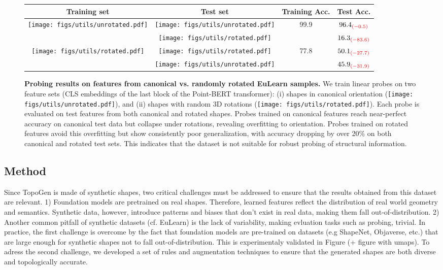 \begin{figure}[t]
\centering
\begin{tabular}{c c c c}
\toprule
\textbf{Training set} & \textbf{Test set} & \textbf{Training Acc.} & \textbf{Test Acc.} \\
\bottomrule
\multirow{2}{*}{\texttt{[image: figs/utils/unrotated.pdf]}} 
  & \texttt{[image: figs/utils/unrotated.pdf]} 
  & \multirow{2}{*}{99.9} 
  & $96.4_{\textcolor{red}{(-0.5)}}$ \\
& \texttt{[image: figs/utils/rotated.pdf]} 
  &  
  & $16.3_{\textcolor{red}{(-83.6)}}$ \\
\midrule
\multirow{2}{*}{\texttt{[image: figs/utils/rotated.pdf]}} 
  & \texttt{[image: figs/utils/rotated.pdf]} 
  & \multirow{2}{*}{77.8} 
  & $50.1_{\textcolor{red}{(-27.7)}}$ \\
& \texttt{[image: figs/utils/unrotated.pdf]} 
  &  
  & $45.9_{\textcolor{red}{(-31.9)}}$ \\
\bottomrule
\end{tabular}
\caption{\textbf{Probing results on features from canonical vs. randomly rotated EuLearn samples.} 
We train linear probes on two feature sets (CLS embeddings of the last block of the Point-BERT transformer): 
(i) shapes in canonical orientation (\texttt{[image: figs/utils/unrotated.pdf]}), and 
(ii) shapes with random 3D rotations (\texttt{[image: figs/utils/rotated.pdf]}). 
Each probe is evaluated on test features from both canonical and rotated shapes. 
Probes trained on canonical features reach near-perfect accuracy on canonical test data but collapse under rotations, revealing overfitting to orientation. 
Probes trained on rotated features avoid this overfitting but show consistently poor generalization, with accuracy dropping by over 20\% on both canonical and rotated test sets. 
This indicates that the dataset is not suitable for robust probing of structural information.}
\label{tab:eulearn-overfit}
\end{figure}

\subsection{Method}


Since TopoGen is made of synthetic shapes, two critical challenges must be addressed to ensure that the results obtained from this dataset are relevant. 1) Foundation models are pretrained on real shapes. Therefore, learned features reflect the distribution of real world geometry and semantics. Synthetic data, however, introduce patterns and biases that don't exist in real data, making them fall out-of-distribution. 2) Another common pitfall of synthetic datasets (cf. EuLearn) is the lack of variability, making evluation tasks such as probing, trivial. In practice, the first challenge is overcome by the fact that foundation models are pre-trained on datasets (e.g ShapeNet, Objaverse, etc.) that are large enough for synthetic shapes not to fall out-of-distribution. This is experimentaly validated in Figure (+ figure with umaps). To adress the second challenge, we developed a set of rules and augmentation techniques to ensure that the generated shapes are both diverse and topologically accurate.

